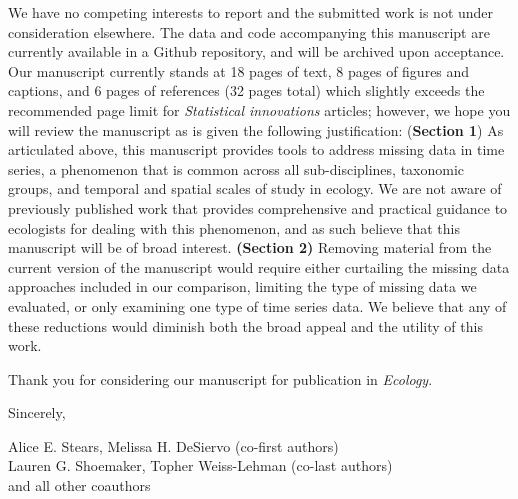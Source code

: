 \documentclass{article}
\begin{document}
\vspace{-0.4em}

We have no competing interests to report and the submitted work is not under consideration elsewhere. The data and code accompanying this manuscript are currently available in a Github repository, and will be archived upon acceptance. Our manuscript currently stands at 18 pages of text, 8 pages of figures and captions, and 6 pages of references (32 pages total) which slightly exceeds the recommended page limit for \textit{Statistical innovations} articles; however, we hope you will review the manuscript as is given the following justification: 
(\textbf{Section 1}) As articulated above, this manuscript provides tools to address missing data in time series, a phenomenon that is common across all sub-disciplines, taxonomic groups, and temporal and spatial scales of study in ecology. We are not aware of previously published work that provides comprehensive and practical guidance to ecologists for dealing with this phenomenon, and as such believe that this manuscript will be of broad interest. \textbf{(Section 2)} Removing material from the current version of the manuscript would require either curtailing the missing data approaches included in our comparison, limiting the type of missing data we evaluated, or only examining one type of time series data. We believe that any of these reductions would diminish both the broad appeal and the utility of this work.  

Thank you for considering our manuscript for publication in \textit{Ecology}.



Sincerely,

Alice E. Stears,  Melissa H. DeSiervo (co-first authors) \\
Lauren G. Shoemaker, Topher Weiss-Lehman (co-last authors) \\
and all other coauthors


\vspace{25pt} %
\end{document}
